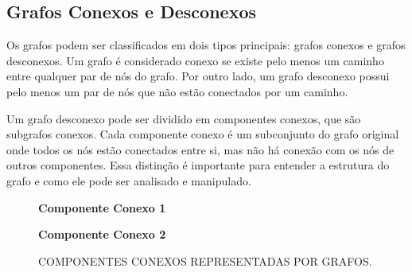 \subsection{Grafos Conexos e Desconexos}

Os grafos podem ser classificados em dois tipos principais: grafos conexos e grafos desconexos. Um grafo é considerado conexo se existe pelo menos um caminho entre qualquer par de nós do grafo. Por outro lado, um grafo desconexo possui pelo menos um par de nós que não estão conectados por um caminho.

Um grafo desconexo pode ser dividido em componentes conexos, que são subgrafos conexos. Cada componente conexo é um subconjunto do grafo original onde todos os nós estão conectados entre si, mas não há conexão com os nós de outros componentes. Essa distinção é importante para entender a estrutura do grafo e como ele pode ser analisado e manipulado.


\begin{figure}[ht]
    \caption{COMPONENTES CONEXOS REPRESENTADAS POR GRAFOS.}
    \centering
    \begin{minipage}{0.45\textwidth}
        \centering
        \textbf{Componente Conexo 1} \\[0.2cm]
    \end{minipage}
    \hfill
    \begin{minipage}{0.45\textwidth}
        \centering
        \textbf{Componente Conexo 2} \\[0.2cm]
    \end{minipage}
    \label{fig:componentes_conexos}
    \end{figure}

